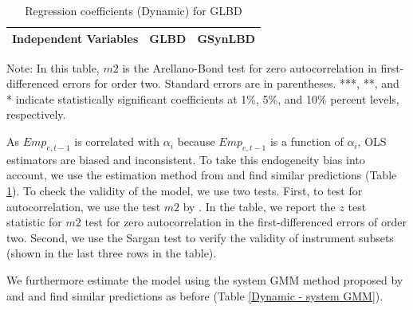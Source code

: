 \begin{table}[H]
  \centering
 \caption{Regression coefficients (Dynamic) for GLBD} \label{Dynamic - GMM} \medskip
\renewcommand{\arraystretch}{1}
\begin{tabular}{l|c |c}
\toprule
\textbf{Independent Variables}&\textbf{GLBD} &\textbf{GSynLBD}\\
\midrule

   \bottomrule
  \end{tabular} 
\begin{tablenotes}
\small
\item Note: In this table, $m2$ is the Arellano-Bond test for zero autocorrelation in first-differenced errors for order two. Standard errors are in parentheses. ***, **, and * indicate statistically significant coefficients at 1\%, 5\%, and 10\% percent levels, respectively.
 \end{tablenotes}
\end{table}

As $Emp_{e,t-1}$ is correlated with $\alpha_{i}$ because $Emp_{e,t-1}$ is a function of $\alpha_{i}$, 
OLS estimators are biased and inconsistent. 
To take this endogeneity bias into account, we use the estimation method from \textcite{RePEc:oup:restud:v:58:y:1991:i:2:p:277-297.} and find similar predictions (Table \ref{Dynamic - GMM}). To check the validity of the model, we use two tests. First, to test for autocorrelation, we use the test $m2$ by \textcite{RePEc:oup:restud:v:58:y:1991:i:2:p:277-297.}. In the table, we report the $z$ test statistic for $m2$ test for zero autocorrelation in the  first-differenced errors of order two. Second, we use the Sargan test to verify the validity of instrument subsets (shown in the last three rows in the table).

We furthermore estimate the model using the system GMM  method proposed by \textcite{RePEc:eee:econom:v:68:y:1995:i:1:p:29-51} and \textcite{RePEc:eee:econom:v:87:y:1998:i:1:p:115-143} and find similar predictions as before (Table \ref{Dynamic - system GMM}). 

